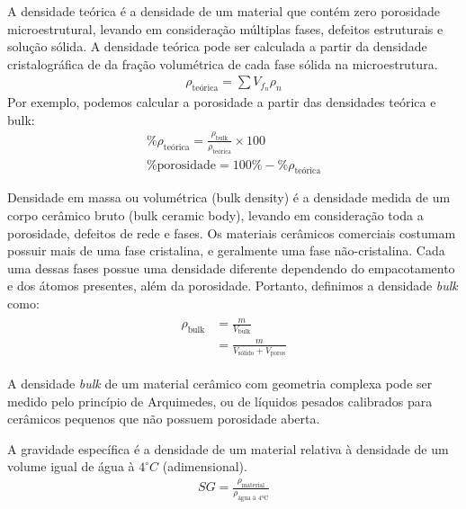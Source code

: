 \begin{definition}
  A densidade teórica é a densidade de um material que contém zero porosidade microestrutural, levando em consideração múltiplas fases, defeitos estruturais e solução sólida. A densidade teórica pode ser calculada a partir da densidade cristalográfica de da fração volumétrica de cada fase sólida na microestrutura.
  \begin{gather}
    \rho_{\text{teórica}} = \sum V_{f_n} \rho_n
  \end{gather}
  Por exemplo, podemos calcular a porosidade a partir das densidades teórica e bulk:
  \begin{gather}
    \% \rho_{\text{teórica}} = \frac{\rho_{\text{bulk}}}{\rho_{\text{teórica}}} \times 100 \\
    \% \text{porosidade} = 100\% - \% \rho_{\text{teórica}}
  \end{gather}
\end{definition}

\begin{definition}
  Densidade em massa ou volumétrica (bulk density) é a densidade medida de um corpo cerâmico bruto (bulk ceramic body), levando em consideração toda a porosidade, defeitos de rede e fases. Os materiais cerâmicos comerciais costumam possuir mais de uma fase cristalina, e geralmente uma fase não-cristalina. Cada uma dessas fases possue uma densidade diferente dependendo do empacotamento e dos átomos presentes, além da porosidade. Portanto, definimos a densidade \textit{bulk} como:
  \begin{gather}
    \begin{align}
      \rho_{\text{bulk}} & = \frac{m}{V_{\text{bulk}}} \\
                      & = \frac{m}{V_{\text{sólido}} + V_{\text{poros}}}
    \end{align}
  \end{gather}
\end{definition}

A densidade \textit{bulk} de um material cerâmico com geometria complexa pode ser medido pelo princípio de Arquimedes, ou de líquidos pesados calibrados para cerâmicos pequenos que não possuem porosidade aberta.

\begin{definition}
  A gravidade específica é a densidade de um material relativa à densidade de um volume igual de água à $4^{\circ}C$ (adimensional).
  \begin{gather}
    SG = \frac{\rho_{\text{material}}}{\rho_{\text{água à 4ºC}}}
  \end{gather}
\end{definition}

